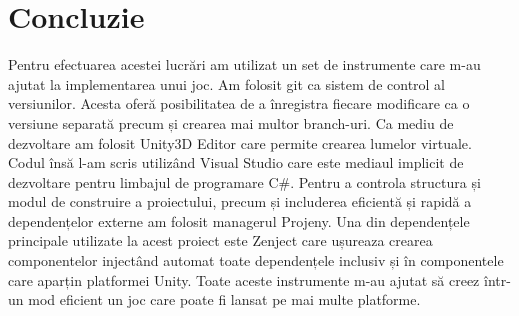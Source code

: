\section*{Concluzie}

Pentru efectuarea acestei lucrări am utilizat un set de instrumente care m-au ajutat la implementarea unui joc. Am folosit git ca sistem de control al versiunilor. Acesta oferă posibilitatea de a înregistra fiecare modificare ca o versiune separată precum și crearea mai multor branch-uri. Ca mediu de dezvoltare am folosit Unity3D Editor care permite crearea lumelor virtuale. Codul însă l-am scris utilizând Visual Studio care este mediaul implicit de dezvoltare pentru limbajul de programare C\#. Pentru a controla structura și modul de construire a proiectului, precum și includerea eficientă și rapidă a dependențelor externe am folosit managerul Projeny. Una din dependențele principale utilizate la acest proiect este Zenject care ușureaza crearea componentelor injectând automat toate dependențele inclusiv și în componentele care aparțin platformei Unity. Toate aceste instrumente m-au ajutat să creez într-un mod eficient un joc care poate fi lansat pe mai multe platforme.

\clearpage